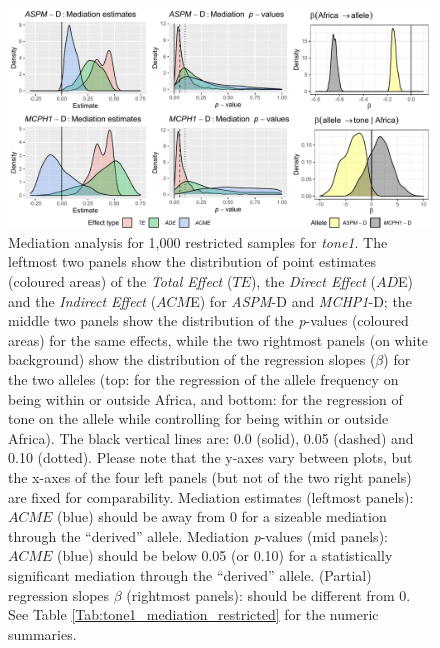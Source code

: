 \documentclass[twoside,onecolumn]{article}
\begin{document}
\begin{figure}[h]
  \centering
  \includegraphics[width=\textwidth]{../../code/figures/tone1_mediation_restricted}
  \caption{Mediation analysis for 1,000 restricted samples for \textit{tone1}. The leftmost two panels show the distribution of point estimates (coloured areas) of the \textit{Total Effect} ($TE$), the \textit{Direct Effect} ($AD$E) and the \textit{Indirect Effect} ($ACM$E) for \textit{ASPM}-D and \textit{MCHP1}-D; the middle two panels show the distribution of the \textit{p}-values (coloured areas) for the same effects, while the two rightmost panels (on white background) show the distribution of the regression slopes ($\beta$) for the two alleles (top: for the regression of the allele frequency on being within or outside Africa, and bottom: for the regression of tone on the allele while controlling for being within or outside Africa). The black vertical lines are: 0.0 (solid), 0.05 (dashed) and 0.10 (dotted). Please note that the y-axes vary between plots, but the x-axes of the four left panels (but not of the two right panels) are fixed for comparability. Mediation estimates (leftmost panels): $ACME$ (blue) should be away from 0 for a sizeable mediation through the ``derived'' allele. Mediation \textit{p}-values (mid panels): $ACME$ (blue) should be below 0.05 (or 0.10) for a statistically significant mediation through the ``derived'' allele. (Partial) regression slopes $\beta$ (rightmost panels): should be different from 0. See Table \ref{Tab:tone1_mediation_restricted} for the numeric summaries.}
  \label{Fig:tone1_mediation_restricted}
\end{figure}
\end{document}

